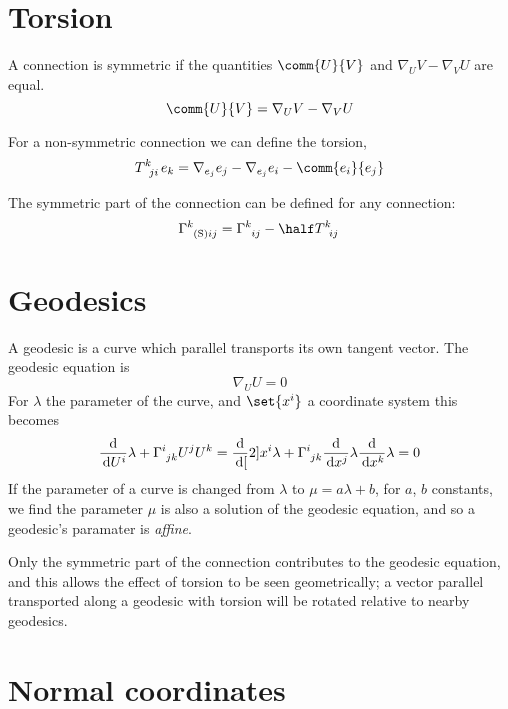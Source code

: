 \section{Torsion}
\label{sec:torsion}

A connection is symmetric if the quantities $\comm{U}{V}$ and
$\nabla_UV - \nabla_V U$ are equal.
\[ \comm{U}{V} = \nabla_U V- \nabla_V U \]

For a non-symmetric connection we can define the torsion,
\begin{equation}
  \label{eq:53}
  \tensor{T}{^k_{ji}} e_k = \nabla_{e_j} e_j - \nabla_{e_j} e_i - \comm{e_i}{e_j}
\end{equation}

The symmetric part of the connection can be defined for any
connection:
\begin{equation}
  \label{eq:54}
  \tensor{\Gamma}{^k_{\rm (S)}_{ij}} = \tensor{\Gamma}{^k_{ij}} - \half \tensor{T}{^k_{ij}}
\end{equation}

\section{Geodesics}
\label{sec:geodesics}

A geodesic is a curve which parallel transports its own tangent
vector. The geodesic equation is 
\begin{equation}
  \label{eq:55}
  \nabla_U U = 0
\end{equation}
For $\lambda$ the parameter of the curve, and $\set{x^i}$ a coordinate system this becomes
\begin{equation}
  \label{eq:56}
  \dv{U^i}{\lambda} + \tensor{\Gamma}{^i_{jk}} U^j U^k = \dv[2]{x^i}{\lambda} + \tensor{\Gamma}{^i_{jk}} \dv{x^j}{\lambda} \dv{x^k}{\lambda} = 0
\end{equation}
If the parameter of a curve is changed from $\lambda$ to $\mu = a
\lambda +b$, for $a$, $b$ constants, we find the parameter $\mu$ is
also a solution of the geodesic equation, and so a geodesic's
paramater is \emph{affine}.

Only the symmetric part of the connection contributes to the geodesic equation, and this allows the effect of torsion to be seen geometrically; a vector parallel transported along a geodesic with torsion will be rotated relative to nearby geodesics.

\section{Normal coordinates}
\label{sec:normal-coordinates}

